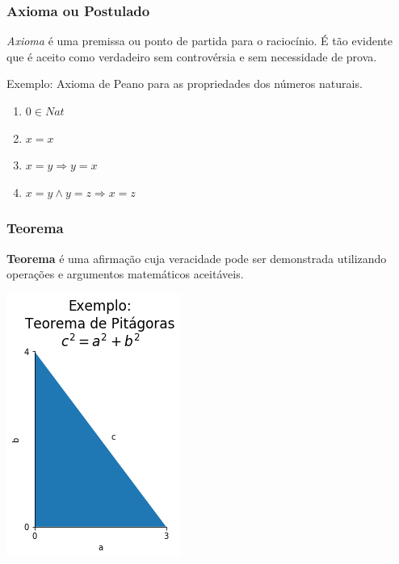 \hypertarget{axioma-ou-postulado}{%
\subsubsection{Axioma ou Postulado}\label{axioma-ou-postulado}}

\emph{Axioma} é uma premissa ou ponto de partida para o raciocínio. É
tão evidente que é aceito como verdadeiro sem controvérsia e sem
necessidade de prova.

Exemplo: Axioma de Peano para as propriedades dos números naturais.

\begin{enumerate}
\def\labelenumi{\arabic{enumi}.}
\item
  \(0 \in Nat\)
\item
  \(x=x\)
\item
  \(x=y \Rightarrow y=x\)
\item
  \(x=y\wedge y=z\Rightarrow x=z\)
\end{enumerate}

    \hypertarget{teorema}{%
\subsubsection{Teorema}\label{teorema}}

\textbf{Teorema} é uma afirmação cuja veracidade pode ser demonstrada
utilizando operações e argumentos matemáticos aceitáveis.

    \begin{center}
	    \includegraphics[scale=.6]{img/pitagoras.png}
    \end{center}
    { \hspace*{\fill} \\}
    
